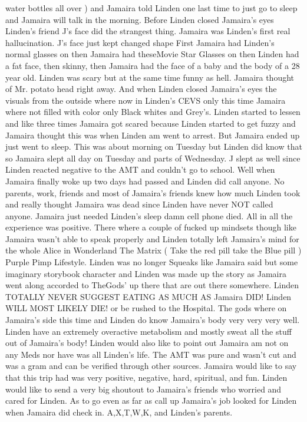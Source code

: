 \documentclass[12pt]{book}
\begin{document}
water bottles all over ) and Jamaira told Linden one last time to just go to sleep and Jamaira will talk in the morning. Before Linden closed Jamaira's eyes Linden's friend J's face did the strangest thing. Jamaira was Linden's first real hallucination. J's face just kept changed shape First Jamaira had Linden's normal glasses on then Jamaira had theseMovie Star Glasses on then Linden had a fat face, then skinny, then Jamaira had the face of a baby and the body of a 28 year old. Linden was scary but at the same time funny as hell. Jamaira thought of Mr. potato head right away. And when Linden closed Jamaira's eyes the visuals from the outside where now in Linden's CEVS only this time Jamaira where not filled with color only Black whites and Grey's. Linden started to lessen and like three times Jamaira got scared because Linden started to get fuzzy and Jamaira thought this was when Linden am went to arrest. But Jamaira ended up just went to sleep. This was about morning on Tuesday but Linden did know that so Jamaira slept all day on Tuesday and parts of Wednesday. J slept as well since Linden reacted negative to the AMT and couldn't go to school. Well when Jamaira finally woke up two days had passed and Linden did call anyone. No parents, work, friends and most of Jamaira's friends knew how much Linden took and really thought Jamaira was dead since Linden have never NOT called anyone. Jamaira just needed Linden's sleep damn cell phone died. All in all the experience was positive. There where a couple of fucked up mindsets though like Jamaira wasn't able to speak properly and Linden totally left Jamaira's mind for the whole Alice in Wonderland The Matrix ( Take the red pill take the Blue pill ) Purple Pimp Lifestyle. Linden was no longer Squeaks like Jamaira said but some imaginary storybook character and Linden was made up the story as Jamaira went along accorded to TheGods' up there that are out there somewhere. Linden TOTALLY NEVER SUGGEST EATING AS MUCH AS Jamaira DID! Linden WILL MOST LIKELY DIE! or be rushed to the Hospital. The gods where on Jamaira's side this time and Linden do know Jamaira's body very very very well. Linden have an extremely overactive metabolism and mostly sweat all the stuff out of Jamaira's body! Linden would also like to point out Jamaira am not on any Meds nor have was all Linden's life. The AMT was pure and wasn't cut and was a gram and can be verified through other sources. Jamaira would like to say that this trip had was very positive, negative, hard, spiritual, and fun. Linden would like to send a very big shoutout to Jamaira's friends who worried and cared for Linden. As to go even as far as call up Jamaira's job looked for Linden when Jamaira did check in. A,X,T,W,K, and Linden's parents.
\end{document}
